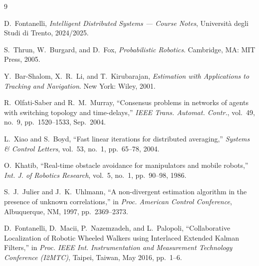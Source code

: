 \documentclass[conference,9pt]{IEEEtran}
\begin{document}
\balance

\begin{thebibliography}{9}

D.~Fontanelli, \emph{Intelligent Distributed Systems --- Course Notes},
Universit\`a degli Studi di Trento, 2024/2025.

S.~Thrun, W.~Burgard, and D.~Fox, \emph{Probabilistic Robotics}.
Cambridge, MA: MIT Press, 2005.

Y.~Bar-Shalom, X.~R.~Li, and T.~Kirubarajan, \emph{Estimation with
Applications to Tracking and Navigation}. New York: Wiley, 2001.

R.~Olfati-Saber and R.~M.~Murray, ``Consensus problems in networks of agents
with switching topology and time-delays,'' \emph{IEEE Trans. Automat. Contr.},
vol.~49, no.~9, pp.~1520--1533, Sep.~2004.

L.~Xiao and S.~Boyd, ``Fast linear iterations for distributed averaging,''
\emph{Systems \& Control Letters}, vol.~53, no.~1, pp.~65--78, 2004.

O.~Khatib, ``Real-time obstacle avoidance for manipulators and mobile
robots,'' \emph{Int. J. of Robotics Research}, vol.~5, no.~1, pp.~90--98, 1986.

S.~J.~Julier and J.~K.~Uhlmann, ``A non-divergent estimation algorithm in the
presence of unknown correlations,'' in \emph{Proc. American Control
Conference}, Albuquerque, NM, 1997, pp.~2369--2373.

D.~Fontanelli, D.~Macii, P.~Nazemzadeh, and L.~Palopoli, ``Collaborative
Localization of Robotic Wheeled Walkers using Interlaced Extended Kalman
Filters,'' in \emph{Proc. IEEE Int. Instrumentation and Measurement Technology
Conference (I2MTC)}, Taipei, Taiwan, May 2016, pp.~1--6.

\end{thebibliography}
\end{document}
